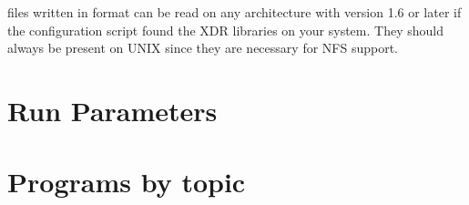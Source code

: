{\gromacs} files written in  format can be read on any
architecture with {\gromacs} version 1.6 or later if the configuration
script found the XDR libraries on your system. They should always be
present on UNIX since they are necessary for NFS support.



\section{Run Parameters}


\section{Programs by topic}


